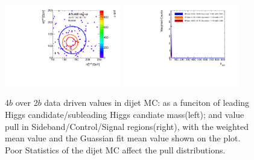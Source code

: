 \begin{figure}[htbp!]
\begin{center}
\includegraphics[width=0.45\textwidth,angle=-90]{figures/boosted/AppendixMuqcdstudy/QCD_FourTag_Incl_mH0H1.pdf}
\includegraphics[width=0.45\textwidth,angle=-90]{figures/boosted/AppendixMuqcdstudy/QCD_FourTag_Incl_mH0H1_pull.pdf}
\caption{4$b$ over 2$b$ data driven \muqcd values in dijet MC: \muqcd as a funciton of leading Higgs candidate/subleading Higgs candiate mass(left); and \muqcd value pull in Sideband/Control/Signal regions(right), with the weighted mean value and the Guassian fit mean value shown on the plot. Poor Statistics of the dijet MC affect the pull distributions.}
\label{fig:app-muqcd-4b-qcd}
\end{center}
\end{figure}


